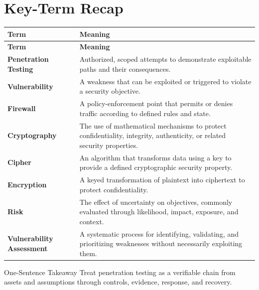 \documentclass[11pt,letterpaper]{article}
\begin{document}
\section*{Key-Term Recap}
\begin{longtable}{>{\raggedright\arraybackslash}p{}>{\raggedright\arraybackslash}p{}}
\toprule\rowcolor{Navy}\color{white}\textbf{Term} & \color{white}\textbf{Meaning}\\\midrule
\endfirsthead
\toprule\rowcolor{Navy}\color{white}\textbf{Term} & \color{white}\textbf{Meaning}\\\midrule
\endhead
\textbf{Penetration Testing} & Authorized, scoped attempts to demonstrate exploitable paths and their consequences. \\\midrule
\textbf{Vulnerability} & A weakness that can be exploited or triggered to violate a security objective. \\\midrule
\textbf{Firewall} & A policy-enforcement point that permits or denies traffic according to defined rules and state. \\\midrule
\textbf{Cryptography} & The use of mathematical mechanisms to protect confidentiality, integrity, authenticity, or related security properties. \\\midrule
\textbf{Cipher} & An algorithm that transforms data using a key to provide a defined cryptographic security property. \\\midrule
\textbf{Encryption} & A keyed transformation of plaintext into ciphertext to protect confidentiality. \\\midrule
\textbf{Risk} & The effect of uncertainty on objectives, commonly evaluated through likelihood, impact, exposure, and context. \\\midrule
\textbf{Vulnerability Assessment} & A systematic process for identifying, validating, and prioritizing weaknesses without necessarily exploiting them. \\\midrule
\bottomrule
\end{longtable}
\begin{CornellExamBox}{One-Sentence Takeaway}
Treat penetration testing as a verifiable chain from assets and assumptions through controls, evidence, response, and recovery.
\end{CornellExamBox}
\end{document}
